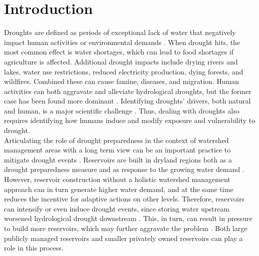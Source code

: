 \documentclass[draft]{agujournal2019}
\begin{document}
\section{Introduction}
Droughts are defined as periods of exceptional lack of water that negatively impact human activities or environmental demands \cite{VanLoon2016}. When drought hits, the most common effect is water shortages, which can lead to food shortages if agriculture is affected. Additional drought impacts include drying rivers and lakes, water use restrictions, reduced electricity production, dying forests, and wildfires. Combined these can cause famine, diseases, and migration.  Human activities can both aggravate and alleviate hydrological droughts, but the former case has been found more dominant \cite{VanLoon2022}. Identifying droughts’ drivers, both natural and human, is a major scientific challenge \cite{Walker2022,Zaniolo2018}. Thus, dealing with droughts also requires identifying how humans induce and modify exposure and vulnerability to drought.\\
Articulating the role of drought preparedness in the context of watershed management areas with a long term view can be an important practice to mitigate drought events \cite{Gutierrez2014}. Reservoirs are built in dryland regions both as a drought preparedness measure and as response to the growing water demand \cite{Rabelo2021}. However, reservoir construction without a holistic watershed management approach can in turn generate higher water demand, and at the same time reduces the incentive for adaptive actions on other levels. Therefore, reservoirs can intensify or even induce drought events, since storing water upstream worsened hydrological drought downstream \cite{HvanLangen2021}. This, in turn, can result in pressure to build more reservoirs, which may further aggravate the problem \cite{DiBaldassarre2018}. Both large publicly managed reservoirs and smaller privately owned reservoirs can play a role in this process.\\
\end{document}
